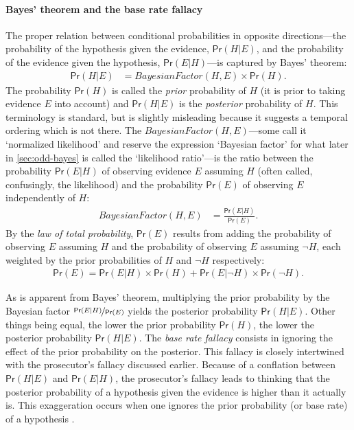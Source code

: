 \documentclass{article}
\newcommand{\pr}{\mathsf{Pr}}
\begin{document}


\paragraph{Bayes' theorem and the base rate fallacy}\label{subsec:BT}

The proper relation between conditional probabilities in opposite directions---the probability of the hypothesis given the evidence, $\pr(H \vert E)$, and the probability of the evidence given the hypothesis, $\pr(E \vert H)$---is captured by   Bayes' theorem:
%
\begin{align*}\pr(H \vert E) & = \textit{BayesianFactor}(H, E) \times \pr(H).\end{align*}
%
The probability $\pr(H)$ is called the \textit{prior} probability of $H$ (it is prior to taking  evidence $E$ into account) and $\pr(H\vert E)$ is the \emph{posterior} probability of $H$. This terminology is standard, but is slightly misleading because it suggests  a temporal ordering which is not there. The $\textit{BayesianFactor}(H, E)$---some call it `normalized likelihood' and reserve the expression `Bayesian factor' for what later in \ref{sec:odd-bayes} is called the `likelihood ratio'---is the ratio between the probability $\pr(E \vert H)$ of observing evidence $E$ assuming $H$ (often called, confusingly, the likelihood) and the probability $\pr(E)$ of observing $E$ independently of $H$:
%
\begin{align*}\textit{BayesianFactor}(H, E) & = \frac{\pr(E \vert H)}{\pr(E)}.\end{align*}
%
By the \emph{law of total probability}, $\pr(E)$ results from adding  the probability of observing $E$ assuming $H$  and the probability of  observing $E$ assuming $\neg H$, each weighted by the prior probabilities of $H$ and $\neg H$ respectively:  
%
\begin{align*}\pr(E)= \pr(E \vert H)\times \pr(H)+\pr(E \vert \neg H)\times \pr(\neg H).\end{align*}
%

 As is apparent from Bayes' theorem, multiplying the prior probability by the Bayesian factor $\nicefrac{\pr(E \vert H)}{\pr(E)}$  yields the posterior probability $\pr(H \vert E)$. 
Other things being equal, the lower the prior probability $\pr(H)$, the lower the posterior probability $\pr(H \vert E)$.
%
%
%
The \textit{base rate fallacy} consists in ignoring the effect of the prior probability on the posterior.
%
This fallacy is closely intertwined 
with the prosecutor's fallacy discussed earlier. Because of a conflation between $\pr(H \vert E)$ and $\pr(E \vert H)$, the prosecutor's fallacy leads to thinking that the posterior probability of a hypothesis given the evidence is higher than it actually is. This exaggeration occurs when one ignores the prior probability (or base rate) of a hypothesis  \citep{KoehlerBaseRate}. 
\end{document}
